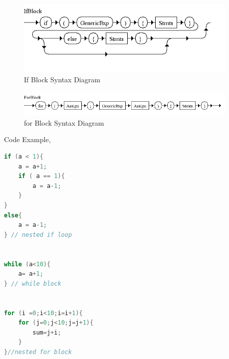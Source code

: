 \begin{figure}[H]
  \centering
	\includegraphics[width=0.95\textwidth]{pic/c4/if_block.png}
	\caption{If Block Syntax Diagram}
\end{figure}

\begin{figure}[H]
  \centering
	\includegraphics[width=0.95\textwidth]{pic/c4/for_block.png}
	\caption{for Block Syntax Diagram}
\end{figure}

Code Example,
\begin{lstlisting}[language=java]
if (a < 1){
	a = a+1;
	if ( a == 1){
		a = a-1;
	}	
}
else{
	a = a-1;
} // nested if loop


while (a<10){
	a= a+1;
} // while block


for (i =0;i<10;i=i+1){
	for (j=0;j<10;j=j+1){
		sum=j+i;
	}
}//nested for block

\end{lstlisting}
